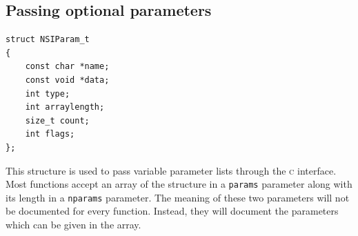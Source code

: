 \documentclass[oneside,ebook]{memoir}
\newcommand*{\acronym}[1]{\textsc{\lowercase{#1}}}
\begin{document}
\subsection{Passing optional parameters}
\label{CAPI:optionalparam}
\begin{lstlisting}[style=CAPI]
struct NSIParam_t
{
	const char *name;
	const void *data;
	int type;
	int arraylength;
	size_t count;
	int flags;
};
\end{lstlisting}

This structure is used to pass variable parameter lists through the \acronym{C} interface. Most functions accept an array of the structure in a \lstinline|params| parameter along with its length in a \lstinline|nparams| parameter. The meaning of these two parameters will not be documented for every function. Instead, they will document the parameters which can be given in the array.
\end{document}
